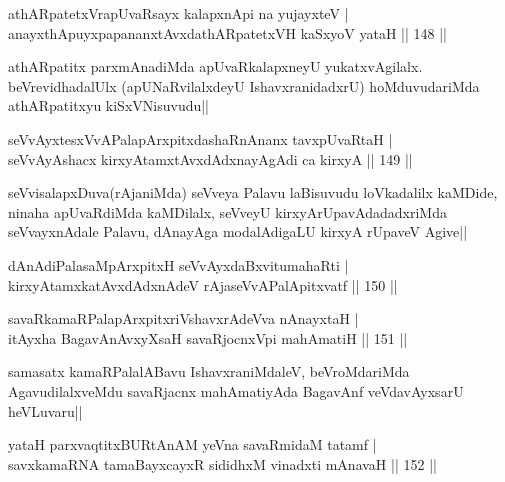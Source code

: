 \begin{shl}
athARpatetxVrapUvaRsayx kalapxnA\s pi na yujayxteV |\\
anayxthA\s puyxpapananxtAvxdathARpatetxVH kaSxyoV yataH \hfill || 148 ||
\end{shl}

\begin{artha}
athARpatitx parxmAnadiMda apUvaRkalapxneyU yukatxvAgilalx. beVrevidhadalUlx (apUNaRvilalxdeyU IshavxranidadxrU) hoMduvudariMda athARpatitxyu kiSxVNisuvudu||
\end{artha}

\begin{shl}
seVvAyxtesxVvAPalapArxpitxdashaRnAnanx tavxpUvaRtaH |\\
seVvAyAshacx kirxyAtamxtAvxdAdxnayAgAdi ca kirxyA \hfill || 149 ||
\end{shl}

\begin{artha}
seVvisalapxDuva(rAjaniMda) seVveya Palavu laBisuvudu loVkadalilx kaMDide, ninaha apUvaRdiMda kaMDilalx, seVveyU kirxyArUpavAdadadxriMda seVvayxnAdale Palavu, dAnayAga modalAdigaLU kirxyA rUpaveV Agive||
\end{artha}


\begin{shl}
dAnAdiPalasaMpArxpitxH seVvAyxdaBxvitumahaRti |\\
kirxyAtamxkatAvxdAdxnAdeV rAjaseVvAPalApitxvatf \hfill || 150 ||
\end{shl}

\begin{shl}
savaRkamaRPalapArxpitxriVshavxrAdeVva nAnayxtaH |\\
itAyxha BagavAnAvxyXsaH savaRjocnxV\s pi mahAmatiH \hfill || 151 ||
\end{shl}

\begin{artha}%
samasatx kamaRPalalABavu IshavxraniMdaleV, beVroMdariMda AgavudilalxveMdu savaRjacnx mahAmatiyAda BagavAnf veVdavAyxsarU heVLuvaru||
\end{artha}


\begin{shl}
yataH parxvaqtitxBURtAnAM yeVna savaRmidaM tatamf |\\
savxkamaRNA tamaBayxcayxR sididhxM vinadxti mAnavaH \hfill || 152 ||
\end{shl}

